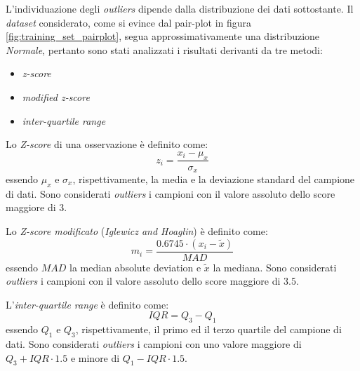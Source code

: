                         L'individuazione degli \textit{outliers} dipende dalla distribuzione dei dati sottostante. Il \textit{dataset} considerato, come si evince dal pair-plot in figura \ref{fig:training_set_pairplot}, segua approssimativamente una distribuzione \textit{Normale}, pertanto sono stati analizzati i risultati derivanti da tre metodi:
                        \begin{itemize}
                            \item \textit{z-score}
                            \item \textit{modified z-score}
                            \item \textit{inter-quartile range}
                        \end{itemize}
                    
                        Lo \textit{Z-score} di una osservazione è definito come:
                        \begin{displaymath}
                                z_i = \frac{x_i - \mu_x}{\sigma_x}
                        \end{displaymath}
                        essendo $\mu_x$ e $\sigma_x$, rispettivamente, la media e la deviazione standard del campione di dati. Sono considerati \textit{outliers} i campioni con il valore assoluto dello score maggiore di $3$.
                        \smallbreak
                        
                        Lo \textit{Z-score modificato} (\textit{Iglewicz and Hoaglin}) è definito come:
                        \begin{displaymath}
                                m_i = \frac{0.6745 \cdot (x_i - \tilde{x})}{MAD}
                        \end{displaymath}
                        essendo $MAD$ la median absolute deviation e $\tilde{x}$ la mediana. Sono considerati \textit{outliers} i campioni con il valore assoluto dello score maggiore di $3.5$.
                        \smallbreak
                        
                        L'\textit{inter-quartile range} è definito come:
                        \begin{displaymath}
                                IQR = Q_3 - Q_1
                        \end{displaymath}
                        essendo $Q_1$ e $Q_3$, rispettivamente, il primo ed il terzo quartile del campione di dati. Sono considerati \textit{outliers} i campioni con uno valore maggiore di $Q_3 + IQR \cdot 1.5$ e minore di $Q_1 - IQR \cdot 1.5$.
                        \smallbreak
                        
